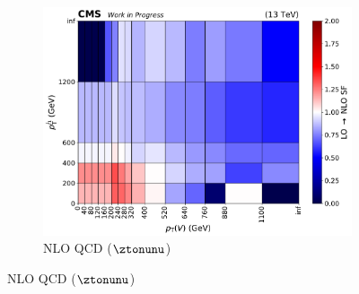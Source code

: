 \begin{figure}[htbp]
\begin{subfigure}[b]{0.32\textwidth}
        \includegraphics[width=\textwidth]{figures/nlo_k_factors/2D_znunu.pdf}
        \caption{NLO QCD ($\ztonunu$)}
    \end{subfigure}


\end{figure}
